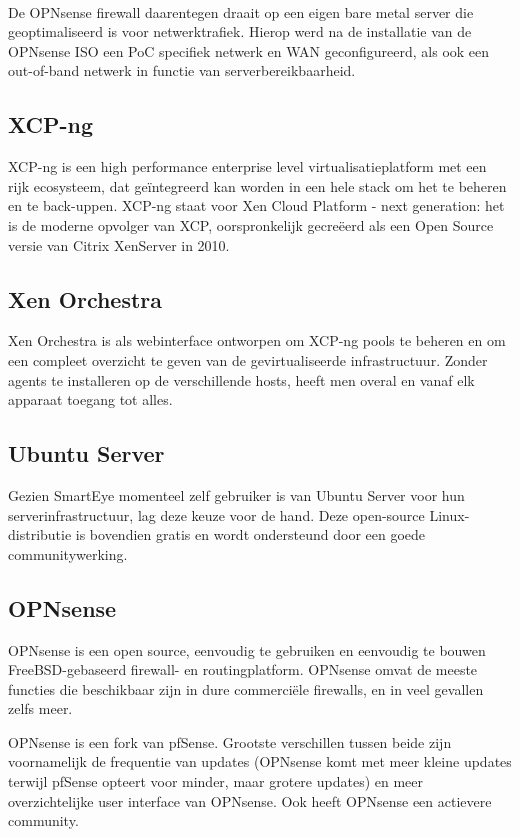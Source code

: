 \paragraph{}
De OPNsense firewall daarentegen draait op een eigen bare metal server die geoptimaliseerd is voor netwerktrafiek. Hierop werd na de installatie van de OPNsense ISO een PoC specifiek netwerk en WAN geconfigureerd, als ook een out-of-band netwerk in functie van serverbereikbaarheid.

\subsection{XCP-ng}
XCP-ng is een high performance enterprise level virtualisatieplatform met een rijk ecosysteem, dat geïntegreerd kan worden in een hele stack om het te beheren en te back-uppen. XCP-ng staat voor Xen Cloud Platform - next generation: het is de moderne opvolger van XCP, oorspronkelijk gecreëerd als een Open Source versie van Citrix XenServer in 2010.~\autocite{Vates2025}

\subsection{Xen Orchestra}
Xen Orchestra is als webinterface ontworpen om XCP-ng pools te beheren en om een compleet overzicht te geven van de gevirtualiseerde infrastructuur. Zonder agents te installeren op de verschillende hosts, heeft men overal en vanaf elk apparaat toegang tot alles.~\autocite{Vates2025a}

\subsection{Ubuntu Server}
Gezien SmartEye momenteel zelf gebruiker is van Ubuntu Server voor hun serverinfrastructuur, lag deze keuze voor de hand. Deze open-source Linux-distributie is bovendien gratis en wordt ondersteund door een goede communitywerking.

\subsection{OPNsense}
OPNsense is een open source, eenvoudig te gebruiken en eenvoudig te bouwen FreeBSD-gebaseerd firewall- en routingplatform. OPNsense omvat de meeste functies die beschikbaar zijn in dure commerciële firewalls, en in veel gevallen zelfs meer.~\autocite{OPNsenseteam2025}

OPNsense is een fork van pfSense. Grootste verschillen tussen beide zijn voornamelijk de frequentie van updates (OPNsense komt met meer kleine updates terwijl pfSense opteert voor minder, maar grotere updates) en meer overzichtelijke user interface van OPNsense. Ook heeft OPNsense een actievere community.

